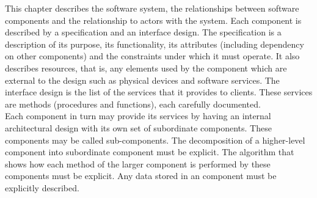 This chapter describes the software system, the relationships between software components and the relationship to actors with the system. Each component is described by a specification and an interface design. The specification is a description of its purpose, its functionality, its attributes (including dependency on other components) and the constraints under which it must operate. It also describes resources, that is, any elements used by the component which are external to the design such as physical devices and software services. The interface design is the list of the services that it provides to clients. These services are methods (procedures and functions), each carefully documented.\\Each component in turn may provide its services by having an internal architectural design with its own set of subordinate components. These components may be called sub-components. The decomposition of a higher-level component into subordinate component must be explicit. The algorithm that shows how each method of the larger component is performed by these components must be explicit. Any data stored in an component must be explicitly described.
